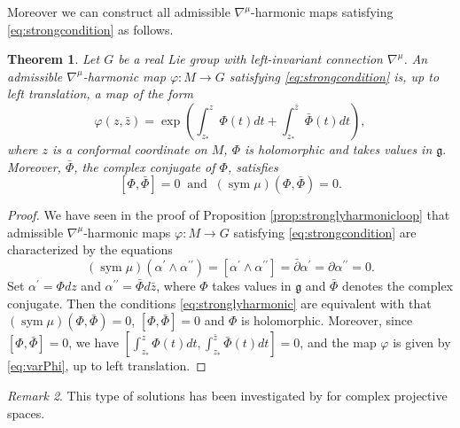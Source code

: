 \documentclass[12pt]{amsart}
\newtheorem{Theorem}{Theorem}[section]
\theoremstyle{definition}
\theoremstyle{remark}
\newtheorem{Remark}[Theorem]{Remark}
\numberwithin{equation}{section}
\begin{document}
 Moreover we can construct all admissible 
 ${\nabla^{\mu}}$-harmonic maps satisfying \eqref{eq:strongcondition} as follows.
\begin{Theorem}\label{thm:strongharmonic}
 Let $G$ be a real Lie group with left-invariant connection ${\nabla^{\mu}}$.
 An admissible ${\nabla^{\mu}}$-harmonic map $\varphi:M\to G$ 
 satisfying \eqref{eq:strongcondition} 
 is, up to left translation, a map of the form
 \begin{equation}\label{eq:varPhi}
\varphi(z, \bar z) =
 \exp\left(\int_{z_*}^z\varPhi(t) dt +\int_{z_*}^{\bar z} \bar{\varPhi}(t) dt\right),
 \end{equation}
 where $z$ is a conformal coordinate on $M$,  
 $\varPhi$ is holomorphic and takes values in $\mathfrak g.$ Moreover,  $\bar\varPhi$, the complex conjugate of $\varPhi$, satisfies 
 \begin{equation}\label{eq:twoconditions}
 [\varPhi,\bar{\varPhi}]=0 \;\;\mbox{and}\;\;
 ({\operatorname {sym}} \mu)(\varPhi,\bar{\varPhi})=0.
\end{equation}
\end{Theorem} 
\begin{proof}
 We have seen in the proof of Proposition \ref{prop:stronglyharmonicloop} that 
 admissible ${\nabla^{\mu}}$-harmonic maps $\varphi:M\to G$ 
 satisfying \eqref{eq:strongcondition} are characterized by the equations 
 \begin{equation}\label{eq:stronglyharmonic}
 ({\operatorname {sym}} \mu) (\alpha^{\prime} \wedge \alpha^{\prime \prime}) = 
 [\alpha^{\prime} \wedge \alpha^{\prime \prime}] = 
 \bar \partial \alpha^{\prime} = \partial \alpha^{\prime \prime} =0.
 \end{equation}
 Set $\alpha^{\prime} = \varPhi dz$ and 
 $\alpha^{\prime \prime} = \bar \varPhi d\bar z$, where $\varPhi$
 takes values in $\mathfrak g$ and $\bar \varPhi$ denotes the 
 complex conjugate.
 Then the conditions \eqref{eq:stronglyharmonic}
 are equivalent with that $({\operatorname {sym}} \mu)(\varPhi,\bar{\varPhi})=0$, 
 $[\varPhi,\bar{\varPhi}] =0$ and $\varPhi$ is holomorphic.
 Moreover, since $[\varPhi,\bar{\varPhi}] =0$, we have $[\int_{z_*}^z\varPhi(t) d t,
 \int_{z_*}^{\bar z}\bar{\varPhi}(t) dt] =0$, and the map $\varphi$ is given by 
 \eqref{eq:varPhi}, up to left translation.
\end{proof}
\begin{Remark}
 This type of solutions has been investigated by \cite{Jensen-Liao}
 for complex projective spaces. 
\end{Remark}
\end{document}

